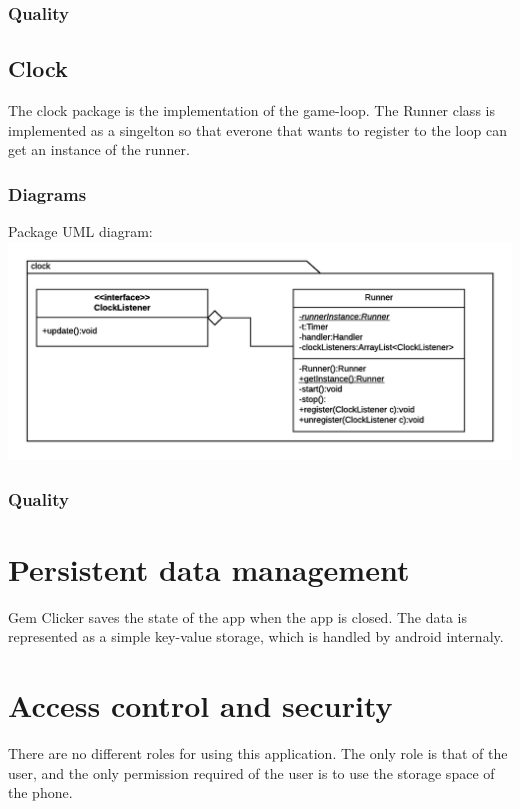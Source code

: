 \documentclass{article}
\begin{document}
\subsubsection{Quality}

\subsection{Clock}
The clock package is the implementation of the game-loop. The Runner class is implemented as a singelton so that everone that wants to register to the loop can get an instance of the runner. 

\subsubsection{Diagrams}
\begin{center}
    Package UML diagram:
    \includegraphics[scale=0.7]{uml/clockUml.png}
\end{center}

\subsubsection{Quality}

\section{Persistent data management}
Gem Clicker saves the state of the app when the app is closed. 
The data is represented as a simple key-value storage, which is handled by android internaly.

\section{Access control and security}
There are no different roles for using this application. The only role is that of the user,
and the only permission required of the user is to use the storage space of the phone.
\end{document}
